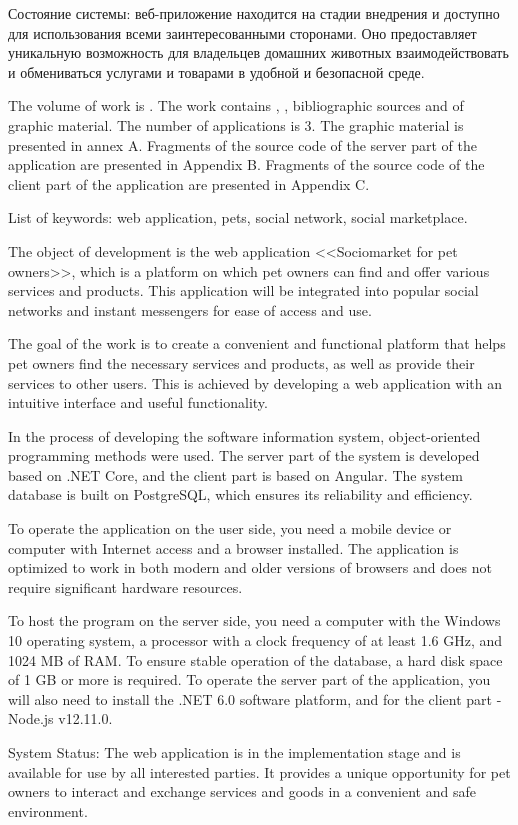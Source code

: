 Состояние системы: веб-приложение находится на стадии внедрения и доступно для использования всеми заинтересованными сторонами. Оно предоставляет уникальную возможность для владельцев домашних животных взаимодействовать и обмениваться услугами и товарами в удобной и безопасной среде.

  
The volume of work is . The work contains , ,  bibliographic sources and  of graphic material. The number of applications is 3. The graphic material is presented in annex A. Fragments of the source code of the server part of the application are presented in Appendix B. Fragments of the source code of the client part of the application are presented in Appendix C.

List of keywords: web application, pets, social network, social marketplace.

The object of development is the web application <<Sociomarket for pet owners>>, which is a platform on which pet owners can find and offer various services and products. This application will be integrated into popular social networks and instant messengers for ease of access and use.

The goal of the work is to create a convenient and functional platform that helps pet owners find the necessary services and products, as well as provide their services to other users. This is achieved by developing a web application with an intuitive interface and useful functionality.

In the process of developing the software information system, object-oriented programming methods were used. The server part of the system is developed based on .NET Core, and the client part is based on Angular. The system database is built on PostgreSQL, which ensures its reliability and efficiency.

To operate the application on the user side, you need a mobile device or computer with Internet access and a browser installed. The application is optimized to work in both modern and older versions of browsers and does not require significant hardware resources.

To host the program on the server side, you need a computer with the Windows 10 operating system, a processor with a clock frequency of at least 1.6 GHz, and 1024 MB of RAM. To ensure stable operation of the database, a hard disk space of 1 GB or more is required. To operate the server part of the application, you will also need to install the .NET 6.0 software platform, and for the client part -\- Node.js v12.11.0.

System Status: The web application is in the implementation stage and is available for use by all interested parties. It provides a unique opportunity for pet owners to interact and exchange services and goods in a convenient and safe environment.

